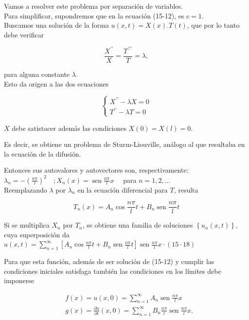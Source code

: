 \documentclass[10pt]{article}
\theoremstyle{plain}
\theoremstyle{definition}
\theoremstyle{remark}
\begin{document}
Vamos a resolver este problema por separación de variables.\\
Para simplificar, supondremos que en la ecuación (15-12), es $c=1$.\\
Buscamos una solución de la forma $u(x, t)=X(x) . T(t)$, que por lo tanto debe verificar

$$
\frac{X^{\prime \prime}}{X}=\frac{T^{\prime \prime \prime}}{T}=\lambda,
$$

para alguna constante $\lambda$.\\
Esto da origen a las dos ecuaciones

$$
\left\{\begin{array}{l}
X^{\prime \prime}-\lambda X=0 \\
T^{\prime \prime}-\lambda T=0
\end{array}\right.
$$

$X$ debe satistacer además las condiciones $X(0)=X(l)=0$.

Es decir, se obtiene un problema de Sturm-Liouville, análogo al que resultaba en la ecuación de la difusión.

Entonces sus autovalores y autovectores son, respectivamente:\\
$\lambda_{n}=-\left(\frac{n \pi}{l}\right)^{2} \quad ; X_{n}(x)=\operatorname{sen} \frac{n \pi}{l} x \quad$ para $n=1,2, \ldots$\\
Reemplazando $\lambda$ por $\lambda_{n}$ en la ecuación diferencial para $T$, resulta

$$
T_{n}(x)=A_{n} \cos \frac{n \pi}{l} t+B_{n} \operatorname{sen} \frac{n \pi}{l} t
$$

Si se multiplica $X_{n}$ por $T_{n}$, se obtiene una familia de soluciones $\left\{u_{n}(x, t)\right\}$, cuya superposición da\\
$u(x, t)=\sum_{n=1}^{\infty}\left[A_{n} \cos \frac{n \pi}{l} t+B_{n} \operatorname{sen} \frac{n \pi}{l} t\right] \operatorname{sen} \frac{n \pi}{l} x \cdot(15 \cdot 18)$

Para que esta función, además de ser solución de (15-12) y cumplir las condiciones iniciales satisfaga también las condiciones en los límites debe imponerse

$$
\begin{aligned}
& f(x)=u(x, 0)=\sum_{n=1}^{\infty} A_{n} \operatorname{sen} \frac{n \pi}{l} x \\
& g(x)=\frac{\partial u}{\partial t}(x, 0)=\sum_{n=1}^{\infty} B_{n} \frac{n \pi}{l} \operatorname{sen} \frac{n \pi}{l} x .
\end{aligned}
$$
\end{document}
